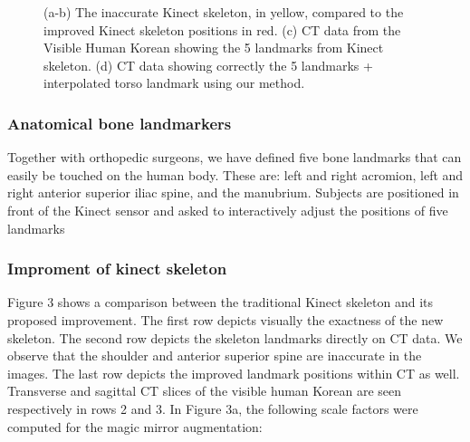 \begin{figure}
	\centering
	\quad
	\label{fig:3-PRMM:5points}
	\caption{(a-b) The inaccurate Kinect skeleton, in yellow, compared to the improved Kinect skeleton positions in red. (c) CT data from the Visible Human Korean showing the 5 landmarks from Kinect skeleton. (d) CT data showing correctly the 5 landmarks + interpolated torso landmark using our method.}
\end{figure} 
\subsubsection{Anatomical bone landmarkers}
Together with orthopedic surgeons, we have defined five bone landmarks that can easily be touched on the human body. These are: left and right acromion, left and right anterior superior iliac spine, and the manubrium. Subjects are positioned in front of the Kinect sensor and asked to interactively adjust the positions of five landmarks
\subsubsection{Improment of kinect skeleton}
Figure 3 shows a comparison between the traditional Kinect skeleton and its proposed improvement. The first row depicts visually the exactness of the new skeleton. The second row depicts the skeleton landmarks directly on CT data. We observe that the shoulder and anterior superior spine are inaccurate in the images. The last row depicts the improved landmark positions within CT as well. Transverse and sagittal CT slices of the visible human Korean are seen respectively in rows 2 and 3.
In Figure 3a, the following scale factors were computed for the magic mirror augmentation:

